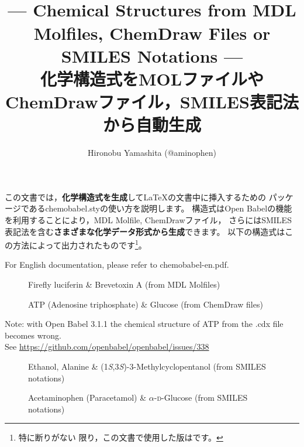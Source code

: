 \documentclass[12pt]{ltjsarticle}
\title{\Lpack{chemobabel} \\[1ex]
  \normalsize --- Chemical Structures from MDL Molfiles,
  ChemDraw Files or SMILES Notations --- \\
  化学構造式をMOLファイルやChemDrawファイル，SMILES表記法から自動生成
  }
\author{Hironobu Yamashita (@aminophen)}
\def\Lpack#1{\textsf{#1}}
\def\Lcode#1{\texttt{#1}}
\begin{document}
\renewcommand{\figurename}{Fig.\,}
\maketitle

この文書では，\textbf{化学構造式を生成}して\LaTeX の文書中に挿入するための
パッケージである\Lpack{chemobabel.sty}の使い方を説明します。
構造式はOpen Babelの機能を利用することにより，MDL Molfile, ChemDrawファイル，
さらにはSMILES表記法を含む\textbf{さまざまな化学データ形式から生成}できます。
以下の構造式はこの方法によって出力されたものです\footnote{特に断りがない
限り，この文書で使用した版は\Lcode{}です。}。

For English documentation, please refer to chemobabel-en.pdf.

\begin{figure}[ht]
  \centering
   \quad
  \caption{Firefly luciferin \& Brevetoxin A (from MDL Molfiles)}
\end{figure}

\begin{figure}[ht]
  \centering
   \hspace{1cm}
  \caption{ATP (Adenosine triphosphate) \& Glucose (from ChemDraw files)}
\end{figure}
\begin{center}\small
Note: with Open Babel 3.1.1 the chemical structure of ATP from the .cdx file
becomes wrong.\\ See \url{https://github.com/openbabel/openbabel/issues/338}
\end{center}

\begin{figure}[ht]
  \centering
   \hspace{1cm}
   \hspace{1cm}
  \caption{Ethanol, Alanine \& (1\textit{S},3\textit{S})-3-Methylcyclopentanol (from SMILES notations)}
\end{figure}

\begin{figure}[ht]
  \centering
   \hspace{1cm}
  \caption{Acetaminophen (Paracetamol) \& $\alpha$-\textsc{d}-Glucose (from SMILES notations)}
\end{figure}
\end{document}
